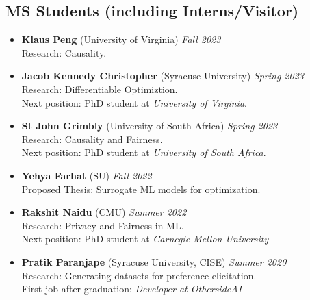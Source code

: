 \subsection*{MS Students (including Interns/Visitor)}
\begin{itemize}
  \item \textbf{Klaus Peng} ({\sc University of Virginia}) \hfill{\em Fall 2023}\\
  {\sc Research:} Causality.
  
  \item \textbf{Jacob Kennedy Christopher} ({\sc Syracuse University}) \hfill{\em Spring 2023}\\
  {\sc Research:} Differentiable Optimiztion.\\
  {\sc Next position:} PhD student at \textit{University of Virginia}.

  \item \textbf{St John Grimbly} ({\sc University of South Africa}) \hfill{\em Spring 2023}\\
  {\sc Research:} Causality and Fairness.\\
  {\sc Next position:} PhD student at \textit{University of South Africa}.

  \item \textbf{Yehya Farhat} ({\sc SU}) \hfill{\em Fall 2022}\\
  {\sc Proposed Thesis:} Surrogate ML models for optimization.

  \item \textbf{Rakshit Naidu} ({\sc CMU}) \hfill{\em Summer 2022}\\
  {\sc Research:} Privacy and Fairness in ML.\\
  {\sc Next position:} PhD student at \textit{Carnegie Mellon University}



  \item \textbf{Pratik Paranjape} ({\sc Syracuse University}, CISE) 
  \hfill{\em Summer 2020}\\
  {\sc Research}: Generating datasets for preference elicitation.\\
  First job after graduation: \textit{Developer at OthersideAI}


\end{itemize}
